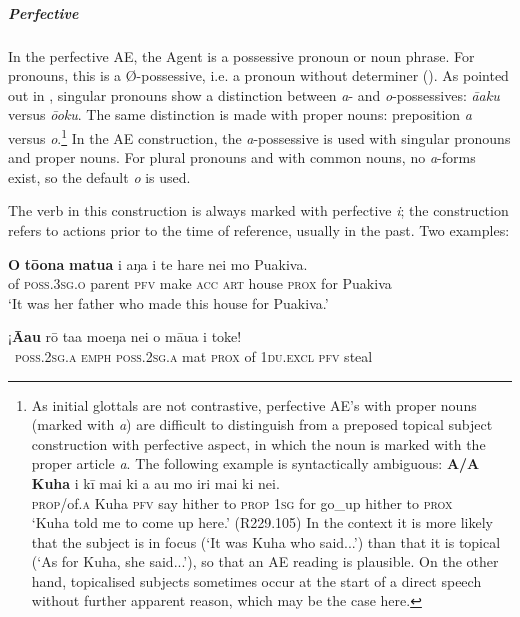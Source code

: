 \subparagraph{Perfective} In the perfective AE, the Agent is a possessive pronoun or noun phrase. For pronouns, this is a Ø-possessive, i.e. a pronoun without determiner (). As pointed out in , singular pronouns show a distinction between \textit{a}{}- and \textit{o}{}-possessives: \textit{{\ꞌ}ā{\ꞌ}aku} versus \textit{ō{\ꞌ}oku}. The same distinction is made with proper nouns: preposition \textit{{\ꞌ}a} versus \textit{o}.\footnote{\label{fn:430}As initial glottals are not contrastive, perfective AE’s with proper nouns (marked with \textit{{\ꞌ}a}) are difficult to distinguish from a preposed topical subject construction with perfective aspect, in which the noun is marked with the proper article \textit{a}. The following example is syntactically ambiguous:
\ea
\gll
\textbf{A/{\ꞌ}A} \textbf{Kuha} i kī mai ki a au mo iri mai ki nei.\\
  \textsc{prop}/of\textsc{.a} Kuha \textsc{pfv} say hither to \textsc{prop} \textsc{1sg} for go\_up hither to \textsc{prox}\\
  \glt 
  ‘Kuha told me to come up here.’ (R229.105)
  \z
In the context it is more likely that the subject is in focus (‘It was Kuha who said...’) than that it is topical (‘As for Kuha, she said...’), so that an AE reading is plausible. On the other hand, topicalised subjects sometimes occur at the start of a direct speech without further apparent reason, which may be the case here.} In the AE construction, the \textit{a}{}-possessive is used with singular pronouns and proper nouns. For plural pronouns and with common nouns, no \textit{a}\nobreakdash-forms exist, so the default \textit{o} is used.

The verb in this construction is always marked with perfective \textit{i}; the construction refers to actions prior to the time of reference, usually in the past. Two examples:

\ea\label{ex:8.96}
\gll \textbf{O} \textbf{tō{\ꞌ}ona} \textbf{matu{\ꞌ}a} i aŋa i te hare nei mo Puakiva. \\
of \textsc{poss.3sg.o} parent \textsc{pfv} make \textsc{acc} \textsc{art} house \textsc{prox} for Puakiva \\

\glt 
‘It was her father who made this house for Puakiva.’ \textstyleExampleref{[R229.269]} 
\z

\ea\label{ex:8.97}
\gll ¡\textbf{{\ꞌ}Ā{\ꞌ}au} rō ta{\ꞌ}a moeŋa nei o māua i toke! \\
~\textsc{poss.2sg.a} \textsc{emph} \textsc{poss.2sg.a} mat \textsc{prox} of \textsc{1du.excl} \textsc{pfv} steal \\

